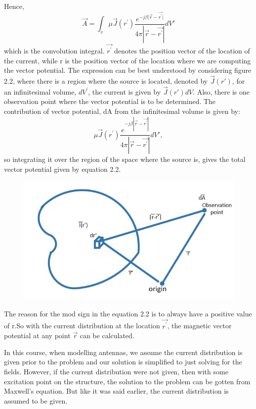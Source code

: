 Hence, 
\begin{equation}
\vec{A}=\int_{v}\mu\vec{J}(r^{'}) \frac{e^{-j\beta\vert\vec{r}-\vec{r^{'}}\vert}}{4\pi|\vec{r}-\vec{r^{'}}|}dV'
\end{equation}
which is the convolution integral. $\vec{r^{'}}$ denotes the position vector of the location of the current, while r is the position vector of the location where we are computing the vector potential. The expression can be best understood by considering figure 2.2, where there is a region where the source is located, denoted by $\vec{J}(r')$, for an infinitesimal volume, $dV^{'}$, the current is given by $\vec{J}(r')dV$. Also, there is one observation point where the vector potential is to be determined. The contribution of vector potential, dA from the infinitesimal volume is given by: 
\begin{equation}
\mu\vec{J}(r^{'}) \frac{e^{-j\beta|\vec{r}-\vec{r^{'}}|}}{4\pi|\vec{r}-\vec{r^{'}}|}dV',
\end{equation}
so integrating it over the region of the space where the source is, gives the total vector potential given by equation 2.2.
\begin{figure}[h]
\centering
\includegraphics[width=1\linewidth]{./graphics/img_2}
\label{fig:1}
\end{figure}
The reason for the mod sign in the equation 2.2 is to always have a positive value of r.So with the current distribution at the location $\vec{r^{'}}$, the magnetic vector potential at any point $\vec{r}$ can be calculated.

In this course, when modelling antennas, we assume the current distribution is given prior to the problem and our solution is simplified to just solving for the fields. However, if the current distribution were not given, then with some excitation point on the structure, the solution to the problem can be gotten from Maxwell's equation. But like it was said earlier, the current distribution is assumed to be given.